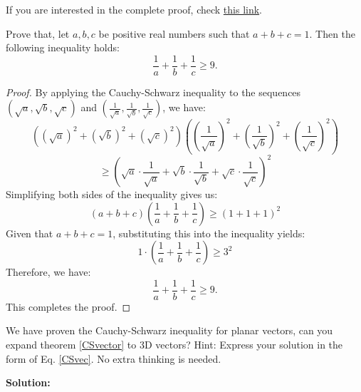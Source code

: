 \documentclass[
	12pt, %
	fleqn, %
	a4paper, %
]{LegrandOrangeBook}
\begin{document}
If you are interested in the complete proof, check \href{https://artofproblemsolving.com/wiki/index.php/Root-Mean_Square-Arithmetic_Mean-Geometric_Mean-Harmonic_mean_Inequality}{this link}.
\begin{exercise}
    Prove that, let \( a, b, c \) be positive real numbers such that \( a + b + c = 1 \). Then the following inequality holds:
\[
\frac{1}{a} + \frac{1}{b} + \frac{1}{c} \geq 9.
\]
\end{exercise}
\begin{proof}
    By applying the Cauchy-Schwarz inequality to the sequences \( (\sqrt{a}, \sqrt{b}, \sqrt{c}) \) and \( (\frac{1}{\sqrt{a}}, \frac{1}{\sqrt{b}}, \frac{1}{\sqrt{c}} ) \), we have:
\[
\left( (\sqrt{a})^2 + (\sqrt{b})^2 + (\sqrt{c})^2 \right) \left( \left(\frac{1}{\sqrt{a}}\right)^2 + \left(\frac{1}{\sqrt{b}}\right)^2 + \left(\frac{1}{\sqrt{c}}\right)^2 \right) 
\]
\[
\geq \left( \sqrt{a} \cdot \frac{1}{\sqrt{a}} + \sqrt{b} \cdot \frac{1}{\sqrt{b}} + \sqrt{c} \cdot \frac{1}{\sqrt{c}} \right)^2
\]
Simplifying both sides of the inequality gives us:
\[
(a + b + c) \left( \frac{1}{a} + \frac{1}{b} + \frac{1}{c} \right) \geq (1 + 1 + 1)^2
\]
Given that \( a + b + c = 1 \), substituting this into the inequality yields:
\[
1 \cdot \left( \frac{1}{a} + \frac{1}{b} + \frac{1}{c} \right) \geq 3^2
\]
Therefore, we have:
\[
\frac{1}{a} + \frac{1}{b} + \frac{1}{c} \geq 9.
\]
This completes the proof.
\end{proof}
\begin{exercise}
    We have proven the Cauchy-Schwarz inequality for planar vectors, can you expand theorem \ref{CSvector}
to 3D vectors? Hint: Express your solution in the form of Eq. \ref{CSvec}. No extra thinking is needed.
\end{exercise}
\textbf{Solution:}
\end{document}
